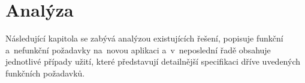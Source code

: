 \chapter{Analýza}
Následující kapitola se zabývá analýzou existujících řešení, popisuje funkční a~nefunkční požadavky na~novou aplikaci a~v~neposlední řadě obsahuje jednotlivé případy užití, které představují detailnější specifikaci dříve uvedených funkčních požadavků.





